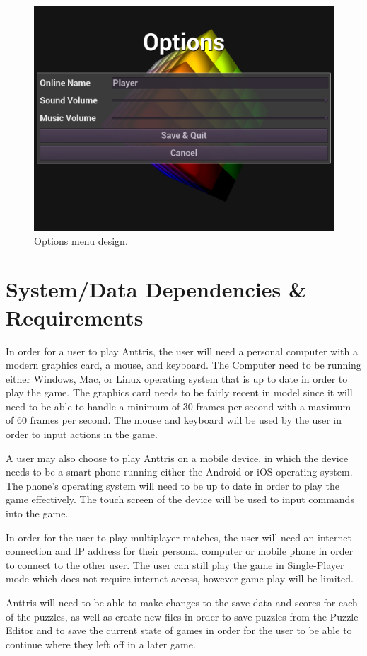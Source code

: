 \documentclass[12pt]{article}
\begin{document}
    \begin{figure}[H]
        \centering
        \includegraphics[width=4.5in]{Anttris_OptionsMenu.png}
        \caption{Options menu design.}
    \end{figure}
\section{System/Data Dependencies \& Requirements}
In order for a user to play Anttris, the user will need a personal computer with a modern graphics card, a mouse, and keyboard. The Computer need to be running either Windows, Mac, or Linux operating system that is up to date in order to play the game.
The graphics card needs to be fairly recent in model since it will need to be able to handle a minimum of 30 frames per second with a maximum of 60 frames per second.
The mouse and keyboard will be used by the user in order to input actions in the game.

A user may also choose to play Anttris on a mobile device, in which the device needs to be a smart phone running either the Android or iOS operating system. The phone's operating system will need to be up to date in order to play the game effectively. The touch screen of the device will be used to input commands into the game.

In order for the user to play multiplayer matches, the user will need an internet connection and IP address for their personal computer or mobile phone in order to connect to the other user. The user can still play the game in Single-Player mode which does not require internet access, however game play will be limited.

Anttris will need to be able to make changes to the save data and scores for each of the puzzles, as well as create new files in order to save puzzles from the Puzzle Editor and to save the current state of games in order for the user to be able to continue where they left off in a later game.
\end{document}
